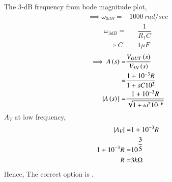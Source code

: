 \documentclass[journal,12pt,twocolumn]{IEEEtran}
\theoremstyle{remark}
\begin{document}
The 3-dB frequency from bode magnitude plot,
\begin{align}
\implies \omega_{3dB} =& 1000 \: rad/sec 
\end{align}
\begin{align}
\omega_{3dB} =& \dfrac{1}{R_1 C}\\
\implies C =& 1\mu F  
\end{align}
\begin{align}
\implies A\left(s\right) =& \dfrac{V_{OUT}\left(s\right)}{V_{IN}\left(s\right)}\\
  		  =& \dfrac{1+10^{-3}R}{1+sC10^3}\\		
  	   |A\left(s\right)| =& \dfrac{1+10^{-3}R}{\sqrt{1+\omega^210^{-6}}}	\\
\end{align}
$A_V$ at low frequency,
\begin{align}
|A_V| =& 1+ 10^{-3}R \\
1+ 10^{-3}R =& 10^{\dfrac{3}{5}}\\
R =& 3k\ohm
\end{align}
Hence, The correct option is .
\end{document}
